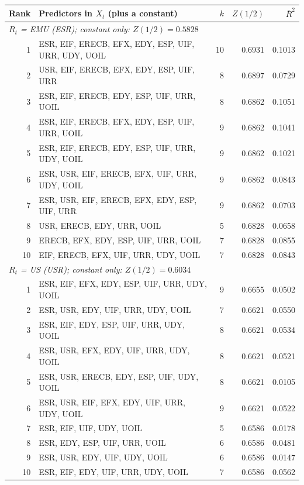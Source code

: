 \begin{tabular}{rp{8.6cm}rrr}
\toprule
Rank & Predictors in $X_t$ (plus a constant) & $k$ & $Z(1/2)$ & $\bar R^2$ \\
\midrule
\multicolumn{5}{l}{\textit{$R_t$ = EMU (ESR); constant only: $Z(1/2)=0.5828$}} \\
1 & ESR, EIF, ERECB, EFX, EDY, ESP, UIF, URR, UDY, UOIL & 10 & 0.6931 & 0.1013 \\
2 & USR, EIF, ERECB, EFX, EDY, ESP, UIF, URR & 8 & 0.6897 & 0.0729 \\
3 & ESR, EIF, ERECB, EDY, ESP, UIF, URR, UOIL & 8 & 0.6862 & 0.1051 \\
4 & ESR, EIF, ERECB, EFX, EDY, ESP, UIF, URR, UOIL & 9 & 0.6862 & 0.1041 \\
5 & ESR, EIF, ERECB, EDY, ESP, UIF, URR, UDY, UOIL & 9 & 0.6862 & 0.1021 \\
6 & ESR, USR, EIF, ERECB, EFX, UIF, URR, UDY, UOIL & 9 & 0.6862 & 0.0843 \\
7 & ESR, USR, EIF, ERECB, EFX, EDY, ESP, UIF, URR & 9 & 0.6862 & 0.0703 \\
8 & USR, ERECB, EDY, URR, UOIL & 5 & 0.6828 & 0.0658 \\
9 & ERECB, EFX, EDY, ESP, UIF, URR, UOIL & 7 & 0.6828 & 0.0855 \\
10 & EIF, ERECB, EFX, UIF, URR, UDY, UOIL & 7 & 0.6828 & 0.0843 \\
\midrule
\multicolumn{5}{l}{\textit{$R_t$ = US (USR); constant only: $Z(1/2)=0.6034$}} \\
1 & ESR, EIF, EFX, EDY, ESP, UIF, URR, UDY, UOIL & 9 & 0.6655 & 0.0502 \\
2 & ESR, USR, EDY, UIF, URR, UDY, UOIL & 7 & 0.6621 & 0.0550 \\
3 & ESR, EIF, EDY, ESP, UIF, URR, UDY, UOIL & 8 & 0.6621 & 0.0534 \\
4 & ESR, USR, EFX, EDY, UIF, URR, UDY, UOIL & 8 & 0.6621 & 0.0521 \\
5 & ESR, USR, ERECB, EDY, ESP, UIF, UDY, UOIL & 8 & 0.6621 & 0.0105 \\
6 & ESR, USR, EIF, EFX, EDY, UIF, URR, UDY, UOIL & 9 & 0.6621 & 0.0522 \\
7 & ESR, EIF, UIF, UDY, UOIL & 5 & 0.6586 & 0.0178 \\
8 & ESR, EDY, ESP, UIF, URR, UOIL & 6 & 0.6586 & 0.0481 \\
9 & ESR, USR, EDY, UIF, UDY, UOIL & 6 & 0.6586 & 0.0147 \\
10 & ESR, EIF, EDY, UIF, URR, UDY, UOIL & 7 & 0.6586 & 0.0562 \\
\bottomrule
\end{tabular}
